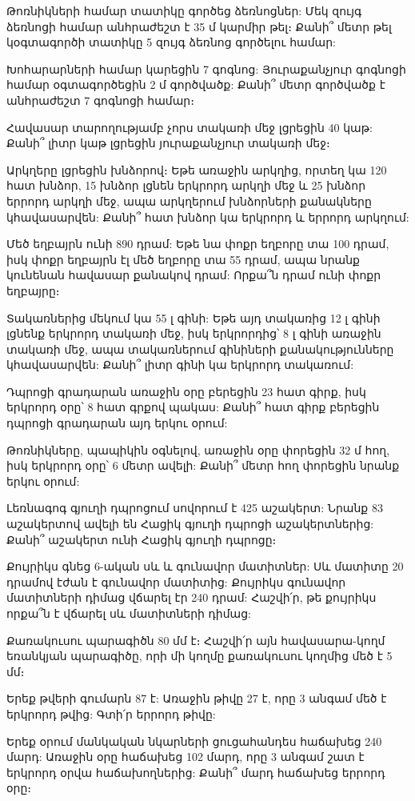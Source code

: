 \problem
Թոռնիկների համար տատիկը գործեց ձեռնոցներ: Մեկ զույգ 
ձեռնոցի համար անհրաժեշտ է 35 մ կարմիր թել։ Քանի՞ մետր 
թել կօգտագործի տատիկը 5 զույգ ձեռնոց գործելու համար:

\problem
Խոհարարների համար կարեցին 7 գոգնոց: Յուրաքանչյուր 
գոգնոցի համար օգտագործեցին 2 մ գործվածք: Քանի՞ մետր 
գործվածք է անհրաժեշտ 7 գոգնոցի համար։

\problem
Հավասար տարողությամբ չորս տակառի մեջ լցրեցին 40 կաթ: 
Քանի՞ լիտր կաթ լցրեցին յուրաքանչյուր տակառի մեջ։

\problem
Արկղերը լցրեցին խնձորով։ Եթե առաջին արկղից, որտեղ կա 120 
հատ խնձոր, 15 խնձոր լցնեն երկրորդ արկղի մեջ և 25 խնձոր 
երրորդ արկղի մեջ, ապա արկղերում խնձորների քանակները 
կհավասարվեն: Քանի՞ հատ խնձոր կա երկրորդ և երրորդ արկղում:

\problem
Մեծ եղբայրն ունի 890 դրամ: Եթե նա փոքր եղբորը տա 100 դրամ, 
իսկ փոքր եղբայրն էլ մեծ եղբորը տա 55 դրամ, ապա նրանք կունենան 
հավասար քանակով դրամ: Որքա՞ն դրամ ունի փոքր եղբայրը։

\problem
Տակառներից մեկում կա 55 լ գինի: Եթե այդ տակառից 12 լ 
գինի լցնենք երկրորդ տակառի մեջ, իսկ երկրորդից՝ 8 լ գինի 
առաջին տակառի մեջ, ապա տակառներում գինիների քանակությունները 
կհավասարվեն: Քանի՞ լիտր գինի կա երկրորդ տակառում:

\problem
Դպրոցի գրադարան առաջին օրը բերեցին 23 հատ գիրք, իսկ երկրորդ 
օրը՝ 8 հատ գրքով պակաս: Քանի՞ հատ գիրք բերեցին դպրոցի գրադարան 
այդ երկու օրում:

\problem
Թոռնիկները, պապիկին օգնելով, առաջին օրը փորեցին 32 մ հող, իսկ 
երկրորդ օրը՝ 6 մետր ավելի: Քանի՞ մետր հող փորեցին նրանք երկու օրում:

\problem
Լեռնագոգ գյուղի դպրոցում սովորում է 425 աշակերտ: Նրանք 83 
աշակերտով ավելի են Հացիկ գյուղի դպրոցի աշակերտներից: Քանի՞ 
աշակերտ ունի Հացիկ գյուղի դպրոցը։

\problem
Քույրիկս գնեց 6-ական սև և գունավոր մատիտներ: Սև մատիտը 20 
դրամով էժան է գունավոր մատիտից: Քույրիկս գունավոր մատիտների 
դիմաց վճարել էր 240 դրամ: Հաշվի՛ր, թե քույրիկս որքա՞ն է վճարել 
սև մատիտների դիմաց:

\problem
Քառակուսու պարագիծն 80 մմ է։ Հաշվի՛ր այն հավասարա-կողմ եռանկյան 
պարագիծը, որի մի կողմը քառակուսու կողմից մեծ է 5 մմ։

\problem
Երեք թվերի գումարն 87 է: Առաջին թիվը 27 է, որը 3 անգամ մեծ է 
երկրորդ թվից: Գտի՛ր երրորդ թիվը:

\problem
Երեք օրում մանկական նկարների ցուցահանդես հաճախեց 240 մարդ: Առաջին 
օրը հաճախեց 102 մարդ, որը 3 անգամ շատ է երկրորդ օրվա հաճախողներից: 
Քանի՞ մարդ հաճախեց երրորդ օրը։

